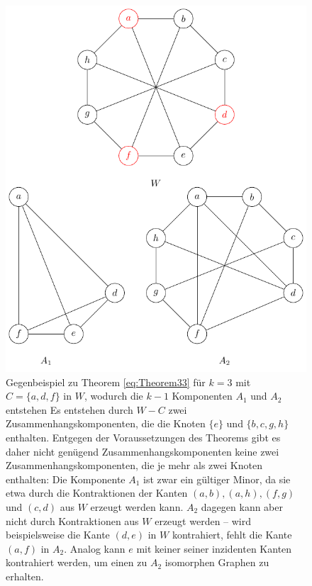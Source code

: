 \begin{figure}[H]
  \centering
  \includegraphics[keepaspectratio]{bilder/Theorem33.pdf}
  \caption{Gegenbeispiel zu Theorem \ref{eq:Theorem33} für  $k=3$ mit $C=\{a, d, f\}$ in $W$, wodurch die $k-1$ Komponenten $A_1$ und $A_2$ entstehen
           Es entstehen durch $W - C$ zwei Zusammenhangskomponenten, die die Knoten $\{e\}$ und $\{b, c, g, h\}$ enthalten.
           Entgegen der Voraussetzungen des Theorems gibt es daher nicht genügend Zusammenhangskomponenten \bzw keine zwei Zusammenhangskomponenten, die je mehr als zwei Knoten enthalten:
           Die Komponente $A_1$ ist zwar ein gültiger Minor, da sie etwa durch die Kontraktionen der Kanten $(a, b), (a, h), (f, g)$ und $(c, d)$ aus $W$ erzeugt werden kann.
           $A_2$ dagegen kann aber nicht durch Kontraktionen aus $W$ erzeugt werden -- wird beispielsweise die Kante $(d, e)$ in $W$ kontrahiert, fehlt die Kante $(a, f)$ in $A_2$.
           Analog kann $e$ mit keiner seiner inzidenten Kanten kontrahiert werden, um einen zu $A_2$ isomorphen Graphen zu erhalten.}
  \label{fig:Theorem33}
\end{figure}


